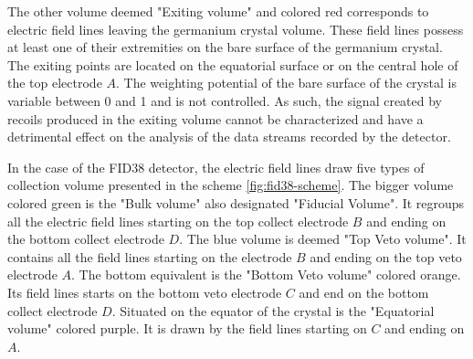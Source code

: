
The other volume deemed "Exiting volume" and colored red corresponds to electric field lines leaving the germanium crystal volume. These field lines possess at least one of their extremities on the bare surface of the germanium crystal. The exiting points are located on the equatorial surface or on the central hole of the top electrode $A$. The weighting potential of the bare surface of the crystal is variable between 0 and 1 and is not controlled. As such, the signal created by recoils produced in the exiting volume cannot be characterized and have a detrimental effect on the analysis of the data streams recorded by the detector.

In the case of the FID38 detector, the electric field lines draw five types of collection volume presented in the scheme \ref{fig:fid38-scheme}. The bigger volume colored green is the "Bulk volume" also designated "Fiducial Volume". It regroups all the electric field lines starting on the top collect electrode $B$ and ending on the bottom collect electrode $D$. The blue volume is deemed "Top Veto volume". It contains all the field lines starting on the electrode $B$ and ending on the top veto electrode $A$. The bottom equivalent is the "Bottom Veto volume" colored orange. Its field lines starts on the bottom veto electrode $C$ and end on the bottom collect electrode $D$. Situated on the equator of the crystal is the "Equatorial volume" colored purple. It is drawn by the field lines starting on $C$ and ending on $A$.

